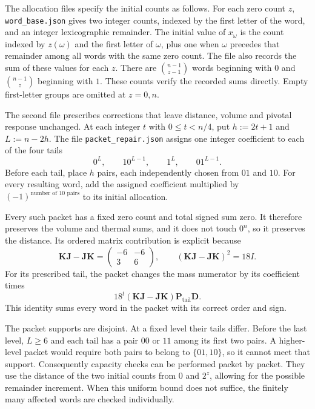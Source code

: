 The allocation files specify the initial counts as follows.
For each zero count $z$, \texttt{word\_base.json} gives two integer counts, indexed by the first letter of the word, and an integer lexicographic remainder. The initial value of $x_\omega$ is the count indexed by $z(\omega)$ and the first letter of $\omega$, plus one when $\omega$ precedes that remainder among all words with the same zero count. The file also records the sum of these values for each $z$.
There are $\binom{n-1}{z-1}$ words beginning with $0$ and $\binom{n-1}{z}$ beginning with $1$. These counts verify the recorded sums directly. Empty first-letter groups are omitted at $z=0,n$.

The second file prescribes corrections that leave distance, volume and pivotal response unchanged.
At each integer $t$ with $0\le t<n/4$, put $h:=2t+1$ and $L:=n-2h$. The file \texttt{packet\_repair.json} assigns one integer coefficient to each of the four tails
\[
 0^L,\qquad10^{L-1},\qquad1^L,\qquad01^{L-1}.
\]
Before each tail, place $h$ pairs, each independently chosen from $01$ and $10$. For every resulting word, add the assigned coefficient multiplied by $(-1)^{\text{number of }10\text{ pairs}}$ to its initial allocation.

Every such packet has a fixed zero count and total signed sum zero. It therefore preserves the volume and thermal sums, and it does not touch $0^n$, so it preserves the distance. Its ordered matrix contribution is explicit because
\[
 \mathbf K\mathbf J-\mathbf J\mathbf K
 =\begin{pmatrix}-6&-6\\3&6\end{pmatrix},\qquad
 (\mathbf K\mathbf J-\mathbf J\mathbf K)^2=18I.
\]
For its prescribed tail, the packet changes the mass numerator by its coefficient times
\[
 18^t(\mathbf K\mathbf J-\mathbf J\mathbf K)
 \mathbf P_{\mathrm{tail}}\mathbf D.
\]
This identity sums every word in the packet with its correct order and sign.

The packet supports are disjoint. At a fixed level their tails differ. Before the last level, $L\ge6$ and each tail has a pair $00$ or $11$ among its first two pairs. A higher-level packet would require both pairs to belong to $\{01,10\}$, so it cannot meet that support. Consequently capacity checks can be performed packet by packet. They use the distance of the two initial counts from $0$ and $2^z$, allowing for the possible remainder increment. When this uniform bound does not suffice, the finitely many affected words are checked individually.

